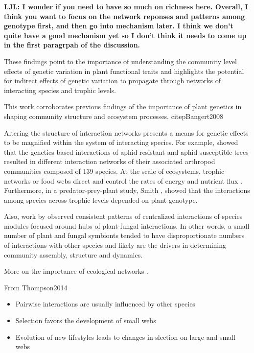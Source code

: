 \documentclass[11pt,twocolumn,twoside,lineno]{pnas-new}
\begin{document}
\textbf{LJL: I wonder if you need to have so much on richness here. 
Overall, I think you want to focus on the network reponses and
patterns among genotype first, and then go into mechanism later. I
think we don’t quite have a good mechanism yet so I don’t think it
needs to come up in the first paragrpah of the discussion.}



These findings point to the importance of understanding the community
level effects of genetic variation in plant functional traits and
highlights the potential for indirect effects of genetic variation to
propagate through networks of interacting species and trophic levels.

This work corroborates previous findings of the importance of plant
genetics in shaping community structure and ecosystem
processes. citep{Bangert2008}


Altering the structure of interaction networks presents a means for
genetic effects to be magnified within the system of interacting
species. For example, \citep{Keith2017} showed that the genetics based
interactions of aphid resistant and aphid susceptible trees resulted
in different interaction networks of their associated arthropod
communities composed of 139 species. At the scale of ecosystems,
trophic networks or food webs direct and control the rates of energy
and nutrient flux \cite{Borgatti2006}. Furthermore, in a
predator-prey-plant study, Smith \cite{Smith2011}, showed that the
interactions among species across trophic levels depended on plant
genotype.

Also, work by \citep{Toju2017, Toju2016, Toju2014a} observed
consistent patterns of centralized interactions of species modules
focused around hubs of plant-fungal interactions. In other words, a
small number of plant and fungal symbionts tended to have
disproportionate numbers of interactions with other species and likely
are the drivers in determining community assembly, structure and
dynamics. 

More on the importance of ecological networks \cite{Guimaraes2011,
  Thompson2013a}.

From Thompson2014

\begin{itemize}
\item Pairwise interactions are usually influenced by other species
\item Selection favors the development of small webs
\item Evolution of new lifestyles leads to changes in slection on
  large and small webs
\end{itemize}
\end{document}

